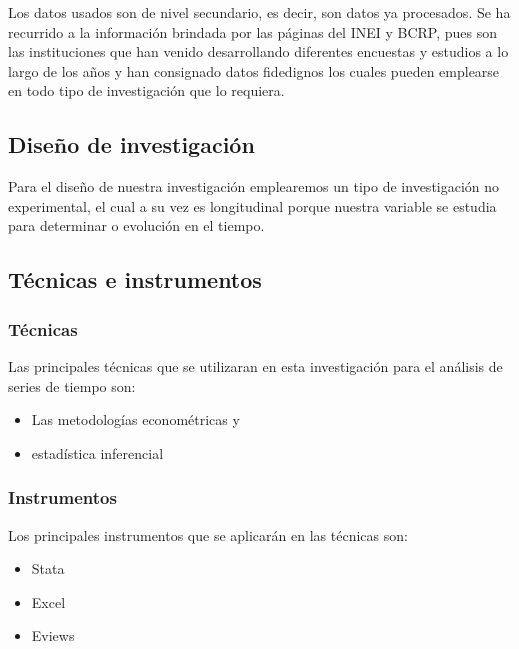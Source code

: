 Los datos usados son de nivel secundario, es decir, son datos ya procesados. Se ha recurrido a la información brindada por las páginas del INEI y BCRP, pues son las instituciones que han venido desarrollando diferentes encuestas y estudios a lo largo de los años y han consignado datos fidedignos los cuales pueden emplearse en todo tipo de investigación que lo requiera.

\subsection{Diseño de investigación}

Para el diseño de nuestra investigación emplearemos un tipo de investigación no experimental, el cual a su vez es longitudinal porque nuestra variable se estudia para determinar o evolución en el tiempo.

\subsection{Técnicas e instrumentos}

	\subsubsection{Técnicas}
	Las principales técnicas que se utilizaran en esta investigación para el análisis de series de tiempo son:
	\begin{itemize}
	\item Las metodologías econométricas y 
    \item estadística inferencial

    \end{itemize}		
	
	\subsubsection{Instrumentos}
	Los principales instrumentos que se aplicarán en las técnicas son:
	
    \begin{itemize}
    \item Stata
    \item Excel
    \item Eviews

    
    \end{itemize}	



		
